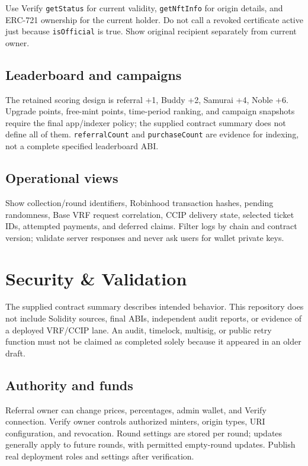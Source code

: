 \documentclass[
  10pt,
  letterpaper,
]{article}
\begin{document}
Use Verify \texttt{getStatus} for current validity, \texttt{getNftInfo}
for origin details, and ERC-721 ownership for the current holder. Do not
call a revoked certificate active just because \texttt{isOfficial} is
true. Show original recipient separately from current owner.

\subsection{Leaderboard and campaigns}\label{leaderboard-and-campaigns}

The retained scoring design is referral +1, Buddy +2, Samurai +4, Noble
+6. Upgrade points, free-mint points, time-period ranking, and campaign
snapshots require the final app/indexer policy; the supplied contract
summary does not define all of them. \texttt{referralCount} and
\texttt{purchaseCount} are evidence for indexing, not a complete
specified leaderboard ABI.

\subsection{Operational views}\label{operational-views}

Show collection/round identifiers, Robinhood transaction hashes, pending
randomness, Base VRF request correlation, CCIP delivery state, selected
ticket IDs, attempted payments, and deferred claims. Filter logs by
chain and contract version; validate server responses and never ask
users for wallet private keys.

\section{Security \& Validation}\label{security-validation}

The supplied contract summary describes intended behavior. This
repository does not include Solidity sources, final ABIs, independent
audit reports, or evidence of a deployed VRF/CCIP lane. An audit,
timelock, multisig, or public retry function must not be claimed as
completed solely because it appeared in an older draft.

\subsection{Authority and funds}\label{authority-and-funds}

Referral owner can change prices, percentages, admin wallet, and Verify
connection. Verify owner controls authorized minters, origin types, URI
configuration, and revocation. Round settings are stored per round;
updates generally apply to future rounds, with permitted empty-round
updates. Publish real deployment roles and settings after verification.
\end{document}
